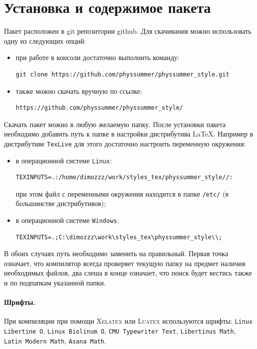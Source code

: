 \section{Установка и содержимое пакета}

Пакет расположен в git репозитории github. Для скачивания можно использовать одну из следующих
опций:
\begin{itemize}
    \item при работе в консоли достаточно выполнить команду:
        \begin{lstlisting}[gobble = 11]
            git clone https://github.com/physsummer/physsummer_style.git
        \end{lstlisting}
    \item также можно скачать вручную по ссылке:
        \begin{lstlisting}[gobble = 11]
            https://github.com/physsummer/physsummer_style/
        \end{lstlisting}
\end{itemize}


Скачать пакет можно в любую желаемую папку. После установки пакета необходимо добавить путь к папке в
настройки дистрибутива \LaTeX. Например в дистрибутиве \texttt{TexLive} для этого достаточно настроить
переменную окружения:

\begin{itemize}
    \item в операционной системе \texttt{Linux}:
        \begin{lstlisting}[gobble = 11]
            TEXINPUTS=.:/home/dimozzz/work/styles_tex/physsummer_style//:
        \end{lstlisting}
        при этом файл с переменными окружения находится в папке \texttt{/etc/} (в большинстве дистрибутивов);
    \item в операционной системе \texttt{Windows}:
        \begin{lstlisting}[gobble = 11]
            TEXINPUTS=.;C:\dimozzz\work\styles_tex\physsummer_style\\;
        \end{lstlisting}
\end{itemize}

В обоих случаях путь необходимо заменить на правильный. Первая точка означает, что компилятор всегда
проверяет текущую папку на предмет наличия необходимых файлов, два слеша в конце означает, что поиск
будет вестись также и по подпапкам указанной папки.

\paragraph{Шрифты.} При компиляции при помощи \textsc{Xelatex} или \textsc{Luatex} используются шрифты:
\texttt{Linux Libertine O}, \texttt{Linux Biolinum O}, \texttt{CMU Typewriter Text},
\texttt{Libertinus Math}, \texttt{Latin Modern Math}, \texttt{Asana Math}.
